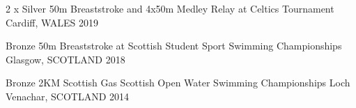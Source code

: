 

\begin{cvhonors}

  \cvhonor
    {2 x Silver} %
    {50m Breaststroke and 4x50m Medley Relay at Celtics Tournament} %
    {Cardiff, WALES} %
    {2019} %

  \cvhonor
    {Bronze} %
    {50m Breaststroke at Scottish Student Sport Swimming Championships} %
    {Glasgow, SCOTLAND} %
    {2018} %


  \cvhonor
    {Bronze} %
    {2KM Scottish Gas Scottish Open Water Swimming Championships} %
    {Loch Venachar, SCOTLAND} %
    {2014} %
    

\end{cvhonors}
